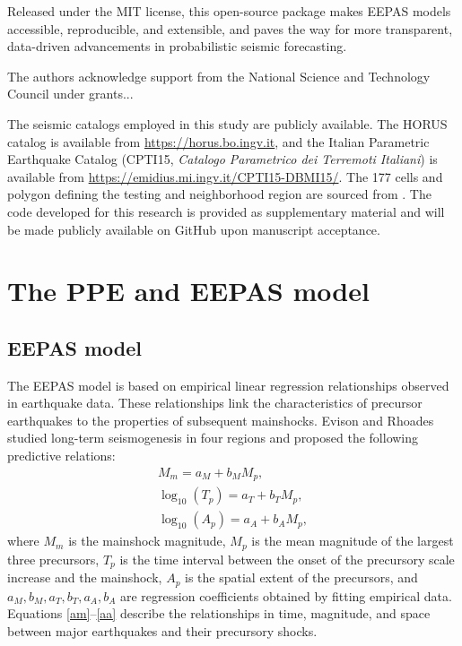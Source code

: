 \documentclass[extra,mreferee]{gji}
\theoremstyle{lemma}
\begin{document}
Released under the MIT license, this open-source package makes EEPAS models accessible, reproducible, and extensible, and paves the way for more transparent, data-driven advancements in probabilistic seismic forecasting.

\begin{acknowledgments}
The authors acknowledge support from the National Science and Technology Council under grants...
\end{acknowledgments}


\begin{dataavailability}
The seismic catalogs employed in this study are publicly available. The HORUS catalog \cite{lolli2020homogenized} is available from \url{https://horus.bo.ingv.it}, and the Italian Parametric Earthquake Catalog (CPTI15, \textit{Catalogo Parametrico dei Terremoti Italiani}) \cite{rovida2020italian} is available from \url{https://emidius.mi.ingv.it/CPTI15-DBMI15/}. The 177 cells and polygon defining the testing and neighborhood region are sourced from \cite{2023ER}. The code developed for this research is provided as supplementary material and will be made publicly available on GitHub upon manuscript acceptance.
\end{dataavailability}




\appendix
\section{The PPE and EEPAS model} 
\label{sec:model}
\subsection{EEPAS model}
The EEPAS model is based on empirical linear regression relationships observed in earthquake data. These relationships link the characteristics of precursor earthquakes to the properties of subsequent mainshocks. Evison and Rhoades \cite{ER} studied long-term seismogenesis in four regions and proposed the following predictive relations:
\begin{eqnarray}
\label{am}    M_m = a_M + b_M M_p,\\
\label{at}    \log_{10}(T_p) = a_T + b_T M_p,\\
\label{aa}    \log_{10}(A_p) = a_A + b_A M_p,
\end{eqnarray}
where $M_m$ is the mainshock magnitude, $M_p$ is the mean magnitude of the largest three precursors, $T_p$ is the time interval between the onset of the precursory scale increase and the mainshock, $A_p$ is the spatial extent of the precursors, and $a_M, b_M, a_T, b_T, a_A, b_A$ are regression coefficients obtained by fitting empirical data. Equations \eqref{am}--\eqref{aa} describe the relationships in time, magnitude, and space between major earthquakes and their precursory shocks.
\end{document}
